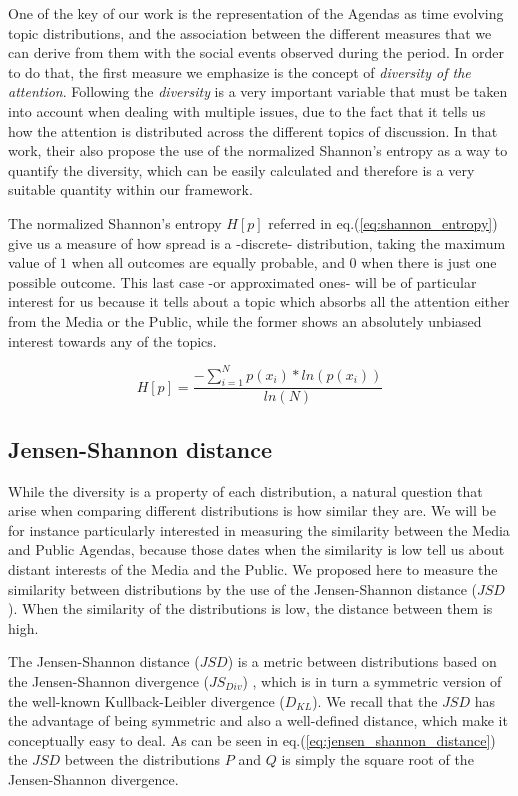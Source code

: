 \documentclass{bmcart}
\begin{document}
\par One of the key of our work is the representation of the Agendas as time evolving topic distributions, and the association between the different measures that we can derive from them with the social events observed during the period.
In order to do that, the first measure we emphasize is the concept of \emph{diversity of the attention}.
Following \cite{boydstun2014importance} the \emph{diversity} is a very important variable that must be taken into account when dealing with multiple issues, due to the fact that it tells us how the attention is distributed across the different topics of discussion. In that work, their also propose the use of the normalized Shannon's entropy as a way to quantify the diversity, which can be easily calculated and therefore is a very suitable quantity within our framework.
\par The normalized Shannon's entropy $H[p]$ referred in eq.(\ref{eq:shannon_entropy}) give us a measure of how spread is a -discrete- distribution, taking the maximum value of $1$ when all outcomes are equally probable, and $0$ when there is just one possible outcome. 
This last case -or approximated ones- will be of particular interest for us because it tells about a topic which absorbs all the attention either from the Media or the Public, while the former shows an absolutely unbiased interest towards any of the topics.

\begin{equation}
H[p] = \frac{- \sum_{i = 1}^{N} p(x_i) * ln(p(x_i))}{ln(N)}
\label{eq:shannon_entropy}
\end{equation}

\subsection*{Jensen-Shannon distance}

\par While the diversity is a property of each distribution, a natural question that arise when comparing different distributions is how similar they are. We will be for instance particularly interested in measuring the similarity between the Media and Public Agendas, because those dates when the similarity is low tell us about distant interests of the Media and the Public.
We proposed here to measure the similarity between distributions by the use of the Jensen-Shannon distance ($JSD$). 
When the similarity of the distributions is low, the distance between them is high.
\par The Jensen-Shannon distance ($JSD$) is a metric between distributions based on the Jensen-Shannon divergence ($JS_{Div}$) \cite{fuglede2004jensen}, which is in turn a symmetric version of the well-known Kullback-Leibler divergence ($D_{KL}$). 
We recall that the $JSD$ has the advantage of being symmetric and also a well-defined distance, which make it conceptually easy to deal.
As can be seen in eq.(\ref{eq:jensen_shannon_distance}) the $JSD$ between the distributions $P$ and $Q$ is simply the square root of the Jensen-Shannon divergence.
\end{document}
